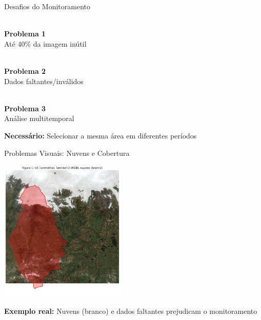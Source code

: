 \documentclass[aspectratio=169,11pt]{beamer}
\begin{document}
\begin{frame}{Desafios do Monitoramento}
\vspace{-0.2cm}
\begin{multicols}{3}
    \begin{center}
        \\
        \textbf{Problema 1}\\
        {\footnotesize Até 40\% da imagem inútil}
    \end{center}
    
    \columnbreak%
    \begin{center}
        \\
        \textbf{Problema 2}\\
        {\footnotesize Dados faltantes/inválidos}
    \end{center}
    
    \columnbreak%
    \begin{center}
        \\
        \textbf{Problema 3}\\
        {\footnotesize Análise multitemporal}
    \end{center}
\end{multicols}

\vspace{0.3cm}
\begin{center}
    \colorbox{accent!10}{\parbox{8cm}{\centering\textbf{Necessário:} Selecionar a mesma área em diferentes períodos}}
\end{center}
\end{frame}

\begin{frame}{Problemas Visuais: Nuvens e Cobertura}
\vspace{-0.5cm}
\begin{center}
    \includegraphics[width=0.45\textwidth]{img/visualizacao_clouds_and_outfovcorner.jpg}
\end{center}
\vspace{-0.2cm}
\begin{center}
    \footnotesize\textbf{Exemplo real:} Nuvens (branco) e dados faltantes prejudicam o monitoramento
\end{center}
\end{frame}
\end{document}
